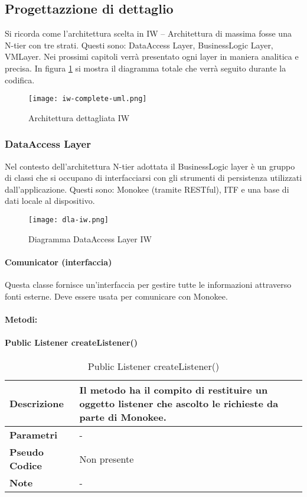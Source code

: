 \subsection{Progettazzione di dettaglio}
Si ricorda come l’architettura scelta in IW – Architettura di massima fosse una N-tier con tre strati. Questi sono: DataAccess Layer, BusinessLogic Layer, VMLayer. Nei prossimi capitoli verrà presentato ogni layer in maniera analitica e precisa. In figura \ref{fig:ark-dett-iw} si mostra il diagramma totale che verrà seguito durante la codifica.

\begin{figure}[htbp]
    \centering
    \texttt{[image: iw-complete-uml.png]} 
    \caption{Architettura dettagliata IW}
    \label{fig:ark-dett-iw} 
\end{figure}
\subsubsection{DataAccess Layer}
Nel contesto dell’architettura N-tier adottata il BusinessLogic layer è un gruppo di classi che si occupano di interfacciarsi con gli strumenti di persistenza utilizzati dall’applicazione. Questi sono: Monokee (tramite RESTful), ITF e una base di dati locale al dispositivo. 
\begin{figure}[htbp]
    \centering
    \texttt{[image: dla-iw.png]} 
    \caption{Diagramma DataAccess Layer IW}
    \label{fig:dla-iw} 
\end{figure}
\paragraph{Comunicator (interfaccia)}
Questa classe fornisce un’interfaccia per gestire tutte le informazioni attraverso fonti esterne. Deve essere usata per comunicare con Monokee.
\paragraph{Metodi:}

\paragraph{Public Listener createListener()}
\begin{center}
    \begin{longtable}{|p{3cm}|p{9cm}|}%
    \caption{Public Listener createListener()}
    \label{tab:public-void-createListener}
    \endfirsthead
    \endhead
    \hline
    \textbf{Descrizione} & Il metodo ha il compito di restituire un oggetto listener che ascolto le richieste da parte di Monokee.\\
    \hline
    \textbf{Parametri} &  - \\
    \hline
    \textbf{Pseudo Codice} & Non presente \\
    \hline
    \textbf{Note} & - \\
    \hline
    \end{longtable}
    \end{center}


